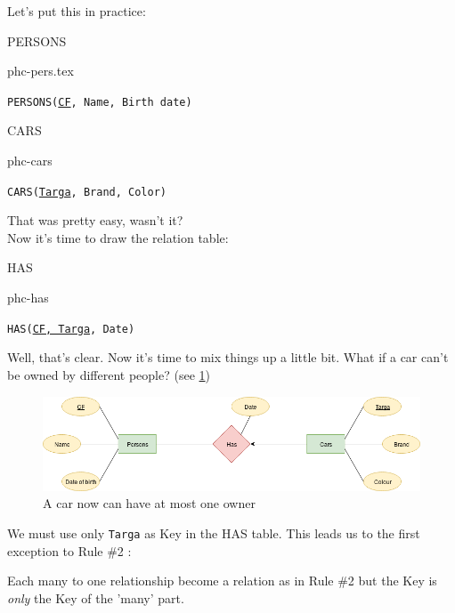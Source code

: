 \documentclass[class=book, crop=false, oneside]{standalone}
\begin{document}
Let's put this in practice:
\vskip 20pt
\begin{minipage}{0.45\textwidth}
	PERSONS
	\begin{table}[H]
		\centering
		{phc-pers.tex}
	\end{table}
	\texttt{PERSONS(\underline{CF}, Name, Birth date)}
\end{minipage}
\hspace{.1\textwidth}
\begin{minipage}{.45\textwidth}
	CARS
	\begin{table}[H]
		\centering
		{phc-cars}
	\end{table}
	\texttt{CARS(\underline{Targa}, Brand, Color)}
\end{minipage}
\vskip 20pt
That was pretty easy, wasn't it?\\
Now it's time to draw the relation table:
\vskip 20pt
\begin{minipage}{.7\textwidth}
	HAS
	\begin{table}[H]
		{phc-has}
	\end{table}
	\texttt{HAS(\underline{CF, Targa}, Date)}
\end{minipage}
\vskip 20pt
Well, that's clear. Now it's time to mix things up a little bit.
What if a car can't be owned by different people? (see \ref{diagram1_01})
\begin{figure}[H]
	\centering
	\includegraphics[width=\textwidth,keepaspectratio]{diagram1_01.png}
	\caption{A car now can have at most one owner}
	\label{diagram1_01}
\end{figure}
We must use only \texttt{Targa} as Key in the HAS table. This leads us to the first exception to Rule \#2	:

Each many to one relationship become a relation as in Rule \#2 but the Key is \emph{only} the Key of the 'many' part.
\end{document}
